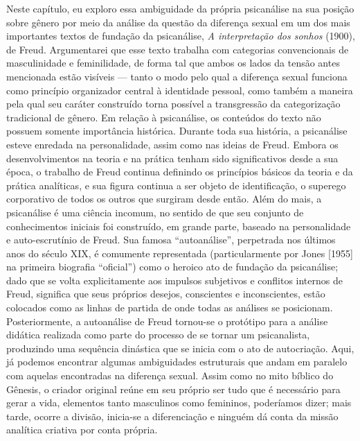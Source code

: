 Neste capítulo, eu exploro essa ambiguidade da própria psicanálise na
sua posição sobre gênero por meio da análise da questão da diferença
sexual em um dos mais importantes textos de fundação da psicanálise,
\emph{A interpretação dos sonhos} (1900), de Freud. Argumentarei que
esse texto trabalha com categorias convencionais de masculinidade e
feminilidade, de forma tal que ambos os lados da tensão antes mencionada
estão visíveis --- tanto o modo pelo qual a diferença sexual funciona
como princípio organizador central à identidade pessoal, como também a
maneira pela qual seu caráter construído torna possível a transgressão
da categorização tradicional de gênero. Em relação à psicanálise, os
conteúdos do texto não possuem somente importância histórica. Durante
toda sua história, a psicanálise esteve enredada na personalidade, assim
como nas ideias de Freud. Embora os desenvolvimentos na teoria e na
prática tenham sido significativos desde a sua época, o trabalho de
Freud continua definindo os princípios básicos da teoria e da prática
analíticas, e sua figura continua a ser objeto de identificação, o
superego corporativo de todos os outros que surgiram desde então. Além
do mais, a psicanálise é uma ciência incomum, no sentido de que seu
conjunto de conhecimentos iniciais foi construído, em grande parte,
baseado na personalidade e auto-escrutínio de Freud. Sua famosa
``autoanálise'', perpetrada nos últimos anos do século XIX, é comumente
representada (particularmente por Jones {[}1955{]} na primeira biografia
``oficial'') como o heroico ato de fundação da psicanálise; dado que se
volta explicitamente aos impulsos subjetivos e conflitos internos de
Freud, significa que seus próprios desejos, conscientes e inconscientes,
estão colocados como as linhas de partida de onde todas as análises se
posicionam. Posteriormente, a autoanálise de Freud tornou-se o protótipo
para a análise didática realizada como parte do processo de se tornar um
psicanalista, produzindo uma sequência dinástica que se inicia com o ato
de autocriação. Aqui, já podemos encontrar algumas ambiguidades
estruturais que andam em paralelo com aquelas encontradas na diferença
sexual. Assim como no mito bíblico do Gênesis, o criador original reúne
em seu próprio ser tudo que é necessário para gerar a vida, elementos
tanto masculinos como femininos, poderíamos dizer; mais tarde, ocorre a
divisão, inicia-se a diferenciação e ninguém dá conta da missão
analítica criativa por conta própria.

